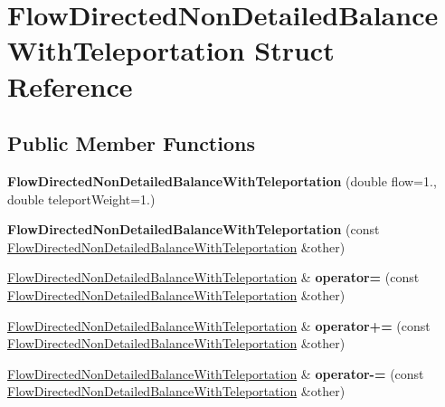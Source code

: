 \hypertarget{structFlowDirectedNonDetailedBalanceWithTeleportation}{}\section{Flow\+Directed\+Non\+Detailed\+Balance\+With\+Teleportation Struct Reference}
\label{structFlowDirectedNonDetailedBalanceWithTeleportation}
\subsection*{Public Member Functions}
\begin{DoxyCompactItemize}
\item 
\mbox{\label{structFlowDirectedNonDetailedBalanceWithTeleportation_aca1e27ad39ab36ca2fb8d28f7817abb4}} 
{\bfseries Flow\+Directed\+Non\+Detailed\+Balance\+With\+Teleportation} (double flow=1., double teleport\+Weight=1.)
\item 
\mbox{\label{structFlowDirectedNonDetailedBalanceWithTeleportation_a2a9a2c5d969d31f9e8f52da21b0cd65f}} 
{\bfseries Flow\+Directed\+Non\+Detailed\+Balance\+With\+Teleportation} (const \mbox{\hyperlink{structFlowDirectedNonDetailedBalanceWithTeleportation}{Flow\+Directed\+Non\+Detailed\+Balance\+With\+Teleportation}} \&other)
\item 
\mbox{\label{structFlowDirectedNonDetailedBalanceWithTeleportation_ab7a66bc5ed1cfad35d9b5bb60e47040b}} 
\mbox{\hyperlink{structFlowDirectedNonDetailedBalanceWithTeleportation}{Flow\+Directed\+Non\+Detailed\+Balance\+With\+Teleportation}} \& {\bfseries operator=} (const \mbox{\hyperlink{structFlowDirectedNonDetailedBalanceWithTeleportation}{Flow\+Directed\+Non\+Detailed\+Balance\+With\+Teleportation}} \&other)
\item 
\mbox{\label{structFlowDirectedNonDetailedBalanceWithTeleportation_aa801280d48c43560bb5138125e3f292e}} 
\mbox{\hyperlink{structFlowDirectedNonDetailedBalanceWithTeleportation}{Flow\+Directed\+Non\+Detailed\+Balance\+With\+Teleportation}} \& {\bfseries operator+=} (const \mbox{\hyperlink{structFlowDirectedNonDetailedBalanceWithTeleportation}{Flow\+Directed\+Non\+Detailed\+Balance\+With\+Teleportation}} \&other)
\item 
\mbox{\label{structFlowDirectedNonDetailedBalanceWithTeleportation_a8a53c8069f10ec0564bb3db5ecfd5103}} 
\mbox{\hyperlink{structFlowDirectedNonDetailedBalanceWithTeleportation}{Flow\+Directed\+Non\+Detailed\+Balance\+With\+Teleportation}} \& {\bfseries operator-\/=} (const \mbox{\hyperlink{structFlowDirectedNonDetailedBalanceWithTeleportation}{Flow\+Directed\+Non\+Detailed\+Balance\+With\+Teleportation}} \&other)
\end{DoxyCompactItemize}
